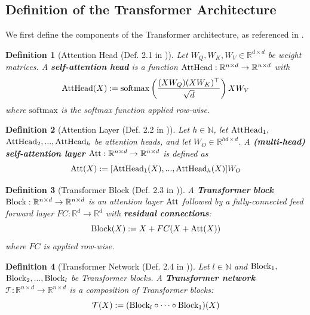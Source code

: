 \documentclass[twoside,11pt]{article}
\newcommand{\RR}{\mathbb{R}}
\newcommand{\NN}{\mathbb{N}}
\newtheorem{definition}{Definition}
\newcommand{\cT}{\mathcal{T}}
\newcommand{\textdef}[1]{\textnormal{\textbf{#1}}}
\begin{document}
\subsection{Definition of the Transformer Architecture}
We first define the components of the Transformer architecture, as referenced in \cite{Sumformer}.

\begin{definition}[Attention Head (Def. 2.1 in \cite{Sumformer})]

Let $W_{Q}, W_{K}, W_{V} \in \mathbb{R}^{d\times d}$ be weight matrices. A \textdef{self-attention head} is a function $\textnormal{AttHead}: \RR^{n\times d} \rightarrow \RR^{n\times d}$ with
\begin{equation}
    \textnormal{AttHead}(X) := \mathrm{softmax} \left( \frac{(XW_{Q})(XW_{K})^{\top}}{\sqrt{d}} \right) XW_{V}
\end{equation}
where $\mathrm{softmax}$ is the softmax function applied row-wise.
\end{definition}

\begin{definition}[Attention Layer (Def. 2.2 in \cite{Sumformer})]


Let $h\in\NN$, let 
$\textnormal{AttHead}_1,$  $ \textnormal{AttHead}_2,..., \textnormal{AttHead}_h$ be attention heads, and 
let $W_O \in \RR^{hd \times d}$. A \textdef{(multi-head) self-attention layer} $\textnormal{Att}: \RR^{n \times d} \rightarrow \RR^{n \times d}$ is defined as
\begin{equation}
    \textnormal{Att}(X) := [\textnormal{AttHead}_1(X), ..., \textnormal{AttHead}_h(X)] W_O
\end{equation}
\end{definition}

\begin{definition}[Transformer Block (Def. 2.3 in \cite{Sumformer})]\label{def:trans-block}
A \textdef{Transformer}    \textdef{block} $\textnormal{Block}: \RR^{n \times d} \rightarrow \RR^{n \times d}$ is an attention layer $\textnormal{Att}$ followed by a fully-connected feed forward layer $FC: \RR^d \rightarrow \RR^d$ with \textdef{residual connections}:
\begin{equation}
    \textnormal{Block}(X) := X + FC(X + \textnormal{Att}(X))
\end{equation}
where $FC$ is applied row-wise.
\end{definition}

\begin{definition}[Transformer Network (Def. 2.4 in \cite{Sumformer})]\label{def:transfor}
Let $l \in \NN$ and $\textnormal{Block}_1,$  $ \textnormal{Block}_2,..., \textnormal{Block}_l$ be Transformer blocks. A \textdef{Transformer network} $\cT: \RR^{n \times d} \rightarrow \RR^{n \times d}$ is a composition of Transformer blocks:
\begin{equation}
    \cT(X) := (\textnormal{Block}_l \circ \dots \circ \textnormal{Block}_1)(X)
\end{equation}
\end{definition}
\end{document}
